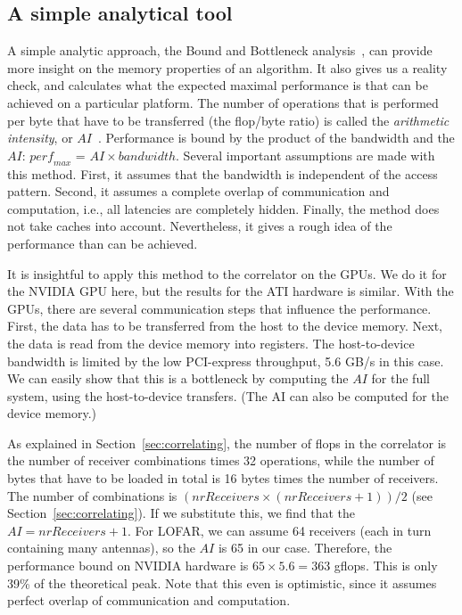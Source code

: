 \documentclass{article}
\begin{document}
\subsection{A simple analytical tool}

A simple analytic approach, the Bound and Bottleneck
analysis~\cite{system-performance,roofline}, can provide more insight
on the memory properties of an algorithm. It also gives us a reality
check, and calculates what the expected maximal performance is that can be
achieved on a particular platform.
The number of operations that is performed per byte that have to be
transferred (the flop/byte ratio) is called the \emph{arithmetic intensity}, or
$AI$~\cite{system-performance}.  Performance is bound by the product
of the bandwidth and the $AI$: 
$\mathit{perf_{max}}$ = $AI \times bandwidth$. 
Several important assumptions are made
with this method. First, it assumes that the bandwidth is
independent of the access pattern.  Second, it assumes a complete
overlap of communication and computation, i.e., all latencies
are completely hidden.  Finally, the method does not take caches into
account. Nevertheless, it gives a rough idea of
the performance than can be achieved.

It is insightful to apply this method to the correlator on the GPUs.
We do it for the NVIDIA GPU here, but the results for the ATI hardware is similar.
With the GPUs, there are several communication steps that influence
the performance. First, the data has to be transferred from the host to
the device memory.  Next, the data is read from the device memory into
registers. The host-to-device bandwidth is limited by the low
PCI-express throughput, 5.6 GB/s in this case. We can easily show that this is a bottleneck
by computing the $AI$ for the full system, using the host-to-device transfers. (The AI can also be computed for
the device memory.)
 
As explained in Section~\ref{sec:correlating}, the number of flops in the correlator is the
number of receiver combinations times 32 operations, while the number
of bytes that have to be loaded in total is 16 bytes times the number
of receivers.  The
number of combinations is $(nrReceivers \times (nrReceivers + 1)) / 2$ (see Section~\ref{sec:correlating}).
If we substitute this, we find that the $AI = nrReceivers + 1$.  For
LOFAR, we can assume 64 receivers (each in turn containing many
antennas), so the $AI$ is 65 in our case.  Therefore, the performance
bound on NVIDIA hardware is $65 \times 5.6 = 363$ gflops. This is only
39\% of the theoretical peak.  Note that this even is optimistic,
since it assumes perfect overlap of communication and computation.
\end{document}
